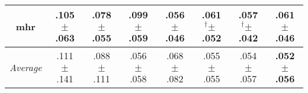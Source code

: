 \begin{tabular}{|c|ccccccc|}
mhr & .105$^{\phantom{\dag}}\pm^{\phantom{\dag}}$.063\cellcolor{red!40} & .078$^{\phantom{\dag}}\pm^{\phantom{\dag}}$.055\cellcolor{green!3} & .099$^{\phantom{\dag}}\pm^{\phantom{\dag}}$.059\cellcolor{red!29} & \textbf{.056$^{\phantom{\dag}}\pm^{\phantom{\dag}}$.046}\cellcolor{green!40} & .061$^{\dag}\pm^{\phantom{\dag}}$.052\cellcolor{green!31} & .057$^{\dag}\pm^{\phantom{\dag}}$.042\cellcolor{green!38} & .061$^{\phantom{\dag}}\pm^{\phantom{\dag}}$.046\cellcolor{green!31} \\\hline
\textit{Average} & .111$^{\phantom{\dag}}\pm^{\phantom{\dag}}$.141\cellcolor{red!40} & .088$^{\phantom{\dag}}\pm^{\phantom{\dag}}$.111\cellcolor{red!7} & .056$^{\phantom{\dag}}\pm^{\phantom{\dag}}$.058\cellcolor{green!34} & .068$^{\phantom{\dag}}\pm^{\phantom{\dag}}$.082\cellcolor{green!19} & .055$^{\phantom{\dag}}\pm^{\phantom{\dag}}$.055\cellcolor{green!36} & .054$^{\phantom{\dag}}\pm^{\phantom{\dag}}$.057\cellcolor{green!38} & \textbf{.052$^{\phantom{\dag}}\pm^{\phantom{\dag}}$.056}\cellcolor{green!40} \\\hline
\end{tabular}